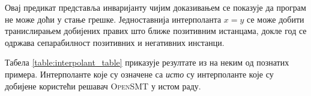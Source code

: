 \documentclass[a4paper]{article}
\begin{document}
{Овај предикат представља инваријанту чијим доказивањем се показује да програм не може доћи у стање грешке.
Једноставнија интерполанта $x = y$ се може добити транислирањем добијених правих што ближе позитивним истанцама,
докле год се одржава сепарабилност позитивних и негативних инстанци.

Табела \ref{table:interpolant_table} приказује резултате из \cite{Sharma_interpolantsas} на неким од познатих
примера. Интерполанте које су означене са \textit{исто} су интерполанте које су добијене користећи решавач \textsc{OpenSMT} \cite{opensmt} у истом раду.  

\begin{table}[]
\centering
\caption{Добијене интерполанте на неким од познатијих тест примера у области.}

\label{table:interpolant_table}

\end{table}

}
\end{document}

